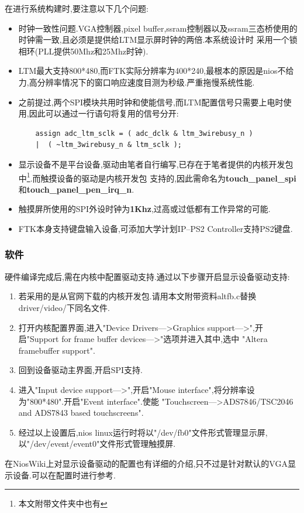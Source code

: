 \documentclass[12pt,a4paper,titlepage]{article}
\begin{document}
在进行系统构建时,要注意以下几个问题:
\begin{itemize}
\item 时钟一致性问题.VGA控制器,pixel buffer,ssram控制器以及ssram三态桥使用的时钟需一致,且必须是提供给LTM显示屏时钟的两倍.本系统设计时
采用一个锁相环(PLL提供50Mhz和25Mhz时钟).
\item LTM最大支持800*480,而FTK实际分辨率为400*240,最根本的原因是nios不给力,高分辨率情况下的窗口响应速度目测为秒级.严重拖慢系统性能.
\item 之前提过,两个SPI模块共用时钟和使能信号,而LTM配置信号只需要上电时使用,因此可以通过一行语句将复用的信号分开:
\begin{verbatim}
    assign adc_ltm_sclk	= ( adc_dclk & ltm_3wirebusy_n ) 
	|  ( ~ltm_3wirebusy_n & ltm_sclk );
\end{verbatim}
\item 显示设备不是平台设备,驱动由笔者自行编写,已存在于笔者提供的内核开发包中\footnote{本文附带文件夹中也有}.而触摸设备的驱动是内核开发包
支持的,因此需命名为\textbf{touch\_panel\_spi}和\textbf{touch\_panel\_pen\_irq\_n}.
\item 触摸屏所使用的SPI外设时钟为\textbf{1Khz},过高或过低都有工作异常的可能.
\item FTK本身支持键盘输入设备,可添加大学计划IP--PS2 Controller支持PS2键盘.
\end{itemize}
\subsubsection{软件}
硬件编译完成后,需在内核中配置驱动支持.通过以下步骤开启显示设备驱动支持:
\begin{enumerate}
\item 若采用的是从官网下载的内核开发包.请用本文附带资料altfb.c替换driver/video/下同名文件.
\item 打开内核配置界面,进入"Device Drivers--->Graphics support--->",开启"Support for frame buffer devices--->"选项并进入其中,选中
"Altera framebuffer support".
\item 回到设备驱动主界面,开启SPI支持.
\item 进入"Input device support--->",开启"Mouse interface",将分辨率设为"800*480".开启"Event interface".使能
"Touchscreen--->ADS7846/TSC2046 and ADS7843 based touchscreens".
\item 经过以上设置后,nios linux运行时将以"/dev/fb0"文件形式管理显示屏,以"/dev/event/event0"文件形式管理触摸屏.
\end{enumerate}
在NiosWiki上对显示设备驱动的配置也有详细的介绍,只不过是针对默认的VGA显示设备.可以在配置时进行参考.
\end{document}

